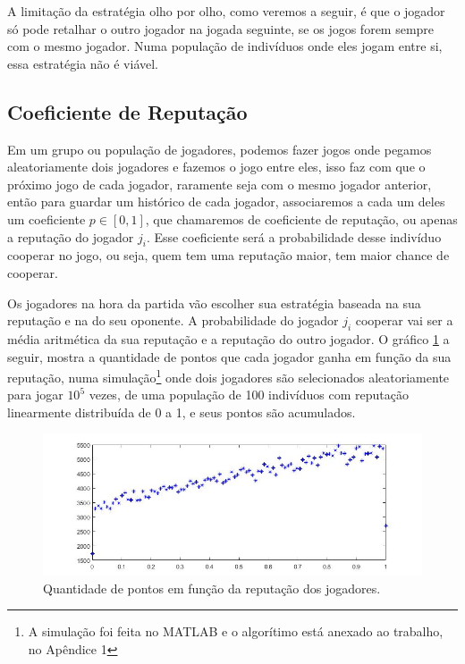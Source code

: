 A limitação da estratégia olho por olho, como veremos a seguir, é que o jogador só pode retalhar o outro jogador na jogada seguinte, se os jogos forem sempre com o mesmo jogador. Numa população de indivíduos onde eles jogam entre si, essa estratégia não é viável.

\subsection{Coeficiente de Reputação}

Em um grupo ou população de jogadores, podemos fazer jogos onde pegamos aleatoriamente dois jogadores e fazemos o jogo entre eles, isso faz com que o próximo jogo de cada jogador, raramente seja com o mesmo jogador anterior, então para guardar um histórico de cada jogador, associaremos a cada um deles um coeficiente $p\in[0,1]$, que chamaremos de coeficiente de reputação, ou apenas a reputação do jogador $j_i$. Esse coeficiente será a probabilidade desse indivíduo cooperar no jogo, ou seja, quem tem uma reputação maior, tem maior chance de cooperar. 

Os jogadores na hora da partida vão escolher sua estratégia baseada na sua reputação e na do seu oponente. A probabilidade do jogador $j_i$ cooperar vai ser a média aritmética da sua reputação e a reputação do outro jogador. O gráfico \ref{fig11} a seguir, mostra a quantidade de pontos que cada jogador ganha em função da sua reputação, numa simulação\footnote{A simulação foi feita no MATLAB e o algorítimo está anexado ao trabalho, no Apêndice 1} onde dois jogadores são selecionados aleatoriamente para jogar $10^5$ vezes, de uma população de 100 indivíduos com reputação linearmente distribuída de 0 a 1, e seus pontos são acumulados.

\begin{figure}[H]
\centering
\includegraphics[width=14cm]{graf11.jpg}
\caption{Quantidade de pontos em função da reputação dos jogadores.}
\label{fig11}
\end{figure}

